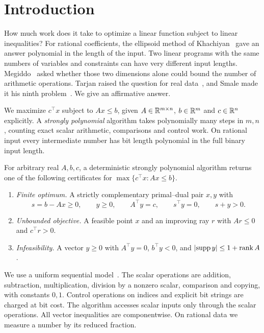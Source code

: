 \section{Introduction}\label{sec:introduction}

How much work does it take to optimize a linear function subject to linear
inequalities? For rational coefficients, the ellipsoid method of
Khachiyan~\cite{Khach,Khach2} gave an answer polynomial in the length of the
input. Two linear programs with the same numbers of variables and constraints
can have very different input lengths. Megiddo~\cite{MegEnc,Meg} asked
whether those two dimensions alone could bound the number of arithmetic
operations. Tarjan raised the question for real data~\cite[pp.~1620--1621]{Tari},
and Smale made it his ninth problem~\cite{Smale}. We give an affirmative answer.

We maximize \(c^\top x\) subject to \(Ax\le b\), given
\(A\in\mathbb R^{m\times n}\), \(b\in\mathbb R^m\) and \(c\in\mathbb R^n\) explicitly.
A \emph{strongly polynomial} algorithm takes polynomially many steps
in \(m,n\), counting exact scalar arithmetic, comparisons and control work.
On rational input every intermediate number has bit length polynomial in
the full binary input length.

\begin{theorem}\label{thm:lp}
For arbitrary real \(A,b,c\), a deterministic strongly polynomial algorithm
returns one of the following certificates for \(\max\{c^\top x:Ax\le b\}\).
\begin{enumerate}
 \item \emph{Finite optimum.} A strictly complementary primal--dual pair \(x,y\) with
 \[
    s=b-Ax\ge0,\qquad y\ge0,\qquad A^\top y=c,\qquad
    s^\top y=0,\qquad s+y>0 .
 \]
 \item \emph{Unbounded objective.} A feasible point \(x\) and an improving ray
 \(r\) with \(Ar\le0\) and \(c^\top r>0\).
 \item \emph{Infeasibility.} A vector \(y\ge0\) with \(A^\top y=0\),
 \(b^\top y<0\), and \(\lvert\operatorname{supp} y\rvert\le 1+\operatorname{rank} A\).
\end{enumerate}
\end{theorem}

We use a uniform sequential model~\cite{BSS}. The scalar operations are
addition, subtraction, multiplication, division by a nonzero scalar,
comparison and copying, with constants \(0,1\). Control operations on
indices and explicit bit strings are charged at bit cost. The algorithm accesses scalar inputs only through the scalar operations.
All vector inequalities are componentwise. On rational data we measure a
number by its reduced fraction.

